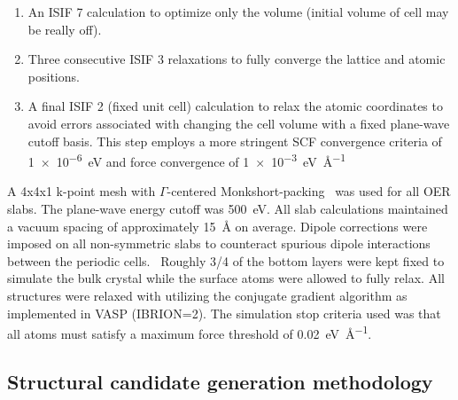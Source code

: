 \begin{enumerate}
  \item An ISIF \num{7} calculation to optimize only the volume (initial volume of cell may be really off).
  \item Three consecutive ISIF \num{3} relaxations to fully converge the lattice and atomic positions.
  \item A final ISIF \num{2} (fixed unit cell) calculation to relax the atomic coordinates to avoid errors associated with changing the cell volume with a fixed plane-wave cutoff basis.
  This step employs a more stringent SCF convergence criteria of \SI{1e-6}{\electronvolt} and force convergence of \SI{1e-3}{\electronvolt\per\angstrom}
\end{enumerate}


%
%
A 4x4x1 k-point mesh with $\Gamma$-centered Monkshort-packing~\cite{Monkhorst1976} was used for all OER slabs.
%
The plane-wave energy cutoff was \SI{500}{\electronvolt}.
%
All slab calculations maintained a vacuum spacing of approximately \SI{15}{\angstrom} on average.
%
Dipole corrections were imposed on all non-symmetric slabs to counteract spurious dipole interactions between the periodic cells.~\cite{Neugebauer1992}
%
Roughly \num{3/4} of the bottom layers were kept fixed to simulate the bulk crystal while the surface atoms were allowed to fully relax.
%
All structures were relaxed with utilizing the conjugate gradient algorithm as implemented in VASP (IBRION\num{=2}).
%
The simulation stop criteria used was that all atoms must satisfy a maximum force threshold of \SI{0.02}{\electronvolt\per\angstrom}.



\subsection{Structural candidate generation methodology}
%

